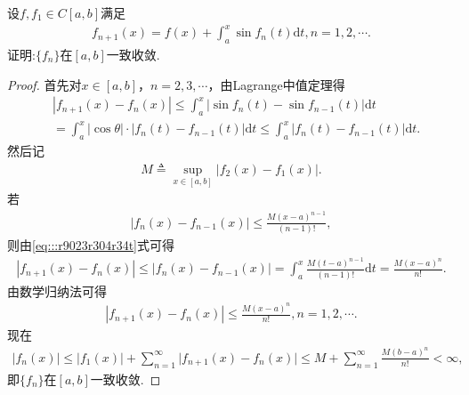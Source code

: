 \documentclass[../../main.tex]{subfiles}
\begin{document}
\begin{example}
设$f,f_1 \in C[a,b]$满足
\begin{align*}
f_{n+1}(x) = f(x) + \int_a^x \sin f_n(t)\mathrm{d}t, n = 1,2,\cdots.
\end{align*}
证明:$\{f_n\}$在$[a,b]$一致收敛.
\end{example}
\begin{proof}
首先对$x \in [a,b]$，$n = 2,3,\cdots$，由Lagrange中值定理得
\begin{align}
&|f_{n+1}(x) - f_n(x)| \leqslant \int_a^x |\sin f_n(t) - \sin f_{n-1}(t)| \mathrm{d}t \nonumber \\
&= \int_a^x |\cos \theta| \cdot |f_n(t) - f_{n-1}(t)| \mathrm{d}t \leqslant \int_a^x |f_n(t) - f_{n-1}(t)| \mathrm{d}t.\label{eq:::r9023r304r34t}
\end{align}
然后记
\begin{align*}
M \triangleq \sup_{x \in [a,b]} |f_2(x) - f_1(x)|.
\end{align*}
若
\begin{align*}
|f_n(x) - f_{n-1}(x)| \leqslant \frac{M(x - a)^{n-1}}{(n - 1)!},
\end{align*}
则由\eqref{eq:::r9023r304r34t}式可得
\begin{align*}
|f_{n+1}(x)-f_n(x)|\leqslant |f_n(x)-f_{n-1}(x)|=\int_a^x{\frac{M(t-a)^{n-1}}{(n-1)!}\mathrm{d}t}=\frac{M(x-a)^n}{n!}.
\end{align*}
由数学归纳法可得
\begin{align*}
|f_{n+1}(x) - f_n(x)| \leqslant \frac{M(x - a)^n}{n!}, n = 1,2,\cdots.
\end{align*}
现在
\begin{align*}
\left| f_n\left( x \right) \right|\leqslant \left| f_1\left( x \right) \right|+\sum_{n=1}^{\infty}{|f_{n+1}(x)}-f_n(x)|\leqslant M+\sum_{n=1}^{\infty}{\frac{M(b-a)^n}{n!}}<\infty ,
\end{align*}
即$\{f_n\}$在$[a,b]$一致收敛.

\end{proof}
\end{document}
